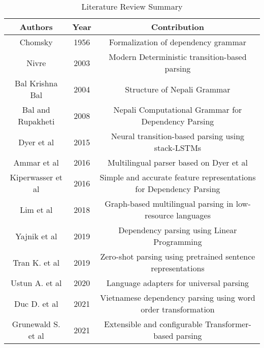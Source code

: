 \begin{table}[ht]
\begin{center}
\begin{tabular}{|c|c|c|}
    \hline
    \textbf{Authors} & \textbf{Year} & \textbf{Contribution} \\
    \hline
    Chomsky & 1956 & Formalization of dependency grammar \\
    \hline
    Nivre & 2003 & Modern Deterministic transition-based parsing \\
    \hline
    Bal Krishna Bal & 2004 & Structure of Nepali Grammar \\
    \hline
    Bal and Rupakheti & 2008 & Nepali Computational Grammar for Dependency Parsing \\
    \hline
    Dyer et al & 2015 & Neural transition-based parsing using stack-LSTMs \\
    \hline
    Ammar et al & 2016 & Multilingual parser based on Dyer et al \\
    \hline
    Kiperwasser et al & 2016 & Simple and accurate feature representations for Dependency Parsing \\
    \hline
    Lim et al & 2018 & Graph-based multilingual parsing in low-resource languages \\
    \hline
    Yajnik et al & 2019 & Dependency parsing using Linear Programming \\
    \hline
    Tran K. et al & 2019 & Zero-shot parsing using pretrained sentence representations \\
    \hline
    Ustun A. et al & 2020 & Language adapters for universal parsing \\
    \hline
    Duc D. et al & 2021 & Vietnamese dependency parsing using word order transformation \\
    \hline
    Grunewald S. et al & 2021 & Extensible and configurable Transformer-based parsing \\
    \hline
\end{tabular}
\caption{Literature Review Summary}
\label{table:literature_review}
\end{center}
\end{table}
